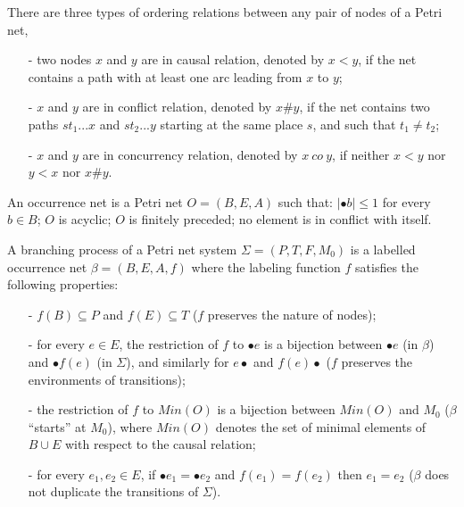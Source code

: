 \documentclass{llncs}
\begin{document}
\begin{definition}\label{def:orderingRelations}
There are three types of ordering relations between any pair of nodes of a Petri net,
	\begin{itemize}
		\item[-] two nodes $x$ and $y$ are in causal relation, denoted by $x<y$, if the net contains a path with at least one arc leading from $x$ to $y$;
		\item[-] $x$ and $y$ are in conflict relation, denoted by $x\#y$, if the net contains two paths $st_{1}...x$ and $st_{2}...y$ starting at the same place $s$, and such that $t_{1}\neq t_{2}$;
		\item[-] $x$ and $y$ are in concurrency relation, denoted by $x~co~y$, if neither $x<y$ nor $y<x$ nor $x\#y$.
	\end{itemize}
\end{definition}

\begin{definition}\label{def:occurrenceNet}
An occurrence net is a Petri net $O=(B,E,A)$ such that: $|\bullet b|\leq 1$ for every $b\in B$; $O$ is acyclic; $O$ is finitely preceded; no element is in conflict with itself.
\end{definition}

\begin{definition}\label{def:branchingProcess}
A branching process of a Petri net system $\Sigma=(P,T,F,M_{0})$ is a labelled occurrence net $\beta=(B,E,A,f)$ where the labeling function $f$ satisfies the following properties:
	\begin{itemize}
		\item[-] $f(B)\subseteq P$ and $f(E)\subseteq T$ ($f$ preserves the nature of nodes);
		\item[-] for every $e\in E$, the restriction of $f$ to $\bullet e$ is a bijection between $\bullet e$ (in $\beta$) and $\bullet f(e)$ (in $\Sigma$), and similarly for $e\bullet$ and $f(e)\bullet$ ($f$ preserves the environments of transitions);
		\item[-] the restriction of $f$ to $Min(O)$ is a bijection between $Min(O)$ and $M_{0}$ ($\beta$ ``starts'' at $M_{0}$), where $Min(O)$ denotes the set of minimal elements of $B\cup E$ with respect to the causal relation;
		\item[-] for every $e_{1},e_{2}\in E$, if $\bullet e_{1}=\bullet e_{2}$ and $f(e_{1})=f(e_{2})$ then $e_{1}=e_{2}$ ($\beta$ does not duplicate the transitions of $\Sigma$).
	\end{itemize}
\end{definition}
\end{document}
